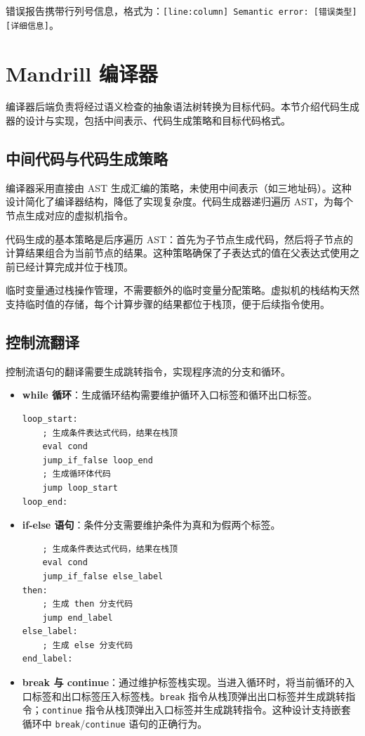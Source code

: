 \documentclass[12pt,hyperref,a4paper,UTF8]{ctexart}
\begin{document}
错误报告携带行列号信息，格式为：\texttt{[line:column] Semantic error: [错误类型] [详细信息]}。

\section{Mandrill 编译器}

编译器后端负责将经过语义检查的抽象语法树转换为目标代码。本节介绍代码生成器的设计与实现，包括中间表示、代码生成策略和目标代码格式。

\subsection{中间代码与代码生成策略}

编译器采用直接由 AST 生成汇编的策略，未使用中间表示（如三地址码）。这种设计简化了编译器结构，降低了实现复杂度。代码生成器递归遍历 AST，为每个节点生成对应的虚拟机指令。

代码生成的基本策略是后序遍历 AST：首先为子节点生成代码，然后将子节点的计算结果组合为当前节点的结果。这种策略确保了子表达式的值在父表达式使用之前已经计算完成并位于栈顶。

临时变量通过栈操作管理，不需要额外的临时变量分配策略。虚拟机的栈结构天然支持临时值的存储，每个计算步骤的结果都位于栈顶，便于后续指令使用。

\subsection{控制流翻译}

控制流语句的翻译需要生成跳转指令，实现程序流的分支和循环。

\begin{itemize}
    \item \textbf{while 循环}：生成循环结构需要维护循环入口标签和循环出口标签。
\begin{verbatim}
loop_start:
    ; 生成条件表达式代码，结果在栈顶
    eval cond
    jump_if_false loop_end
    ; 生成循环体代码
    jump loop_start
loop_end:
\end{verbatim}

    \item \textbf{if-else 语句}：条件分支需要维护条件为真和为假两个标签。
\begin{verbatim}
    ; 生成条件表达式代码，结果在栈顶
    eval cond
    jump_if_false else_label
then:
    ; 生成 then 分支代码
    jump end_label
else_label:
    ; 生成 else 分支代码
end_label:
\end{verbatim}

    \item \textbf{break 与 continue}：通过维护标签栈实现。当进入循环时，将当前循环的入口标签和出口标签压入标签栈。\texttt{break} 指令从栈顶弹出出口标签并生成跳转指令；\texttt{continue} 指令从栈顶弹出入口标签并生成跳转指令。这种设计支持嵌套循环中 \texttt{break}/\texttt{continue} 语句的正确行为。
\end{itemize}
\end{document}
